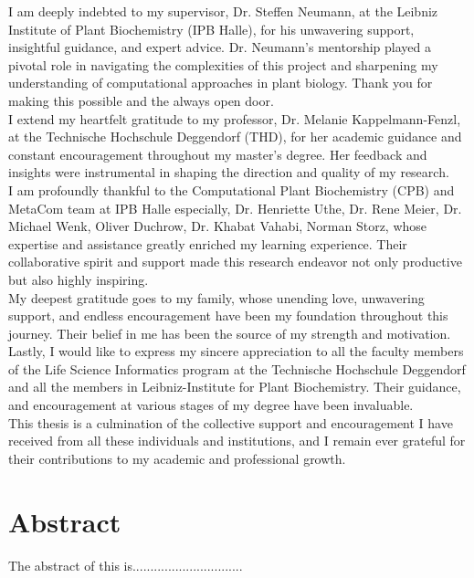 \documentclass[12pt,a4paper]{report}
\begin{document}
I am deeply indebted to my supervisor, Dr. Steffen Neumann, at the Leibniz Institute of Plant Biochemistry (IPB Halle), for his unwavering support, insightful guidance, and expert advice. Dr. Neumann’s mentorship played a pivotal role in navigating the complexities of this project and sharpening my understanding of computational approaches in plant biology. Thank you for making this possible and the always open door. \\

I extend my heartfelt gratitude to my professor, Dr. Melanie Kappelmann-Fenzl, at the Technische Hochschule Deggendorf (THD), for her academic guidance and constant encouragement throughout my master’s degree. Her feedback and insights were instrumental in shaping the direction and quality of my research. \\

I am profoundly thankful to the Computational Plant Biochemistry (CPB) and  MetaCom team at IPB Halle especially, Dr. Henriette Uthe, Dr. Rene Meier, Dr. Michael Wenk, Oliver Duchrow, Dr. Khabat Vahabi, Norman Storz, whose expertise and assistance greatly enriched my learning experience. Their collaborative spirit and support made this research endeavor not only productive but also highly inspiring. \\

My deepest gratitude goes to my family, whose unending love, unwavering support, and endless encouragement have been my foundation throughout this journey. Their belief in me has been the source of my strength and motivation. \\

Lastly, I would like to express my sincere appreciation to all the faculty members of the Life Science Informatics program at the Technische Hochschule Deggendorf and all the members in Leibniz-Institute for Plant Biochemistry. Their guidance, and encouragement at various stages of my degree have been invaluable. \\

This thesis is a culmination of the collective support and encouragement I have received from all these individuals and institutions, and I remain ever grateful for their contributions to my academic and professional growth. \\


\newpage
\section{Abstract}
\noindent
The abstract of this is...............................
\end{document}
